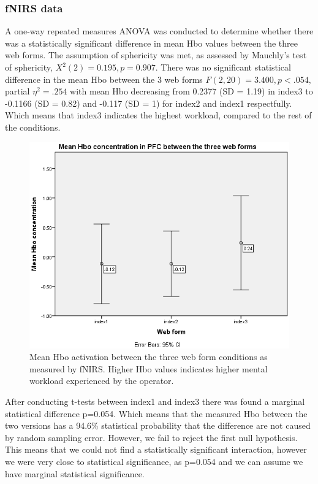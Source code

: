 \documentclass[a4paper]{report}
\begin{document}
			\subsubsection{fNIRS data}
			A one-way repeated measures ANOVA was conducted to determine whether there was a statistically significant difference in mean Hbo values between the three web forms. The assumption of sphericity was met, as assessed by Mauchly's test of sphericity, $X^{2}(2) = 0.195, p = 0.907$. There was no significant statistical difference in the mean Hbo between the 3 web forms  $F(2,20)=3.400, p<.054,$ partial $\eta^{2}=.254$ with mean Hbo decreasing from 0.2377 (SD = 1.19) in index3 to -0.1166 (SD = 0.82) and -0.117 (SD = 1) for index2 and index1 respectfully. Which means that index3 indicates the highest workload, compared to the rest of the conditions.
			\begin{figure}[h]
				\centering
				\includegraphics[width=0.7\linewidth]{mean-hbo-index123}
				\caption[mean Hbo activation between the three web forms]{Mean Hbo activation between the three web form conditions as measured by fNIRS. Higher Hbo values indicates higher mental workload experienced by the operator.}
				\label{fig:mean-hbo-index123}
			\end{figure}
			After conducting t-tests between index1 and index3 there was found a marginal statistical difference p=0.054. Which means that the measured Hbo between the two versions has a 94.6\% statistical probability that the difference are not caused by random sampling error. However, we fail to reject the first null hypothesis. This means that we could not find a statistically significant interaction, however we were very close to statistical significance, as p=0.054 and we can assume we have marginal statistical significance.
	
\end{document}
